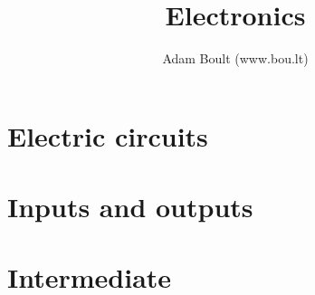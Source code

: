 \documentclass[oneside]{book}
\begin{document}
\author{Adam Boult (www.bou.lt)}
\title{Electronics}
\maketitle

\setcounter{tocdepth}{0}
\tableofcontents



\part{Electric circuits}





\part{Inputs and outputs}







\part{Intermediate}


\end{document}
